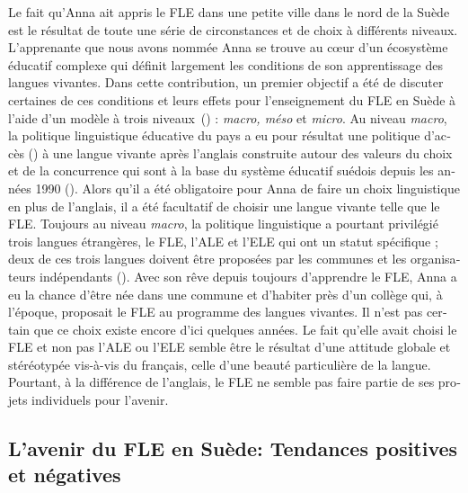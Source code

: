 \documentclass[french, output=paper]{langscibook}
\begin{document}
\begin{otherlanguage}{french}
Le fait qu’Anna ait appris le FLE dans une petite ville dans le nord de la Suède est le résultat de toute une série de circonstances et de choix à différents niveaux. L’apprenante que nous avons nommée Anna se trouve au cœur d’un écosystème éducatif complexe qui définit largement les conditions de son apprentissage des langues vivantes. Dans cette contribution, un premier objectif a été de discuter certaines de ces conditions et leurs effets pour l’enseignement du FLE en Suède à l’aide d’un modèle à trois niveaux~(\citealt{TheDouglasFirgroup2016}) : \textit{macro, méso} et \textit{micro}. Au niveau \textit{macro}, la politique linguistique éducative du pays a eu pour résultat une politique d’accès (\citealt{KaplanBaldauf2005}) à une langue vivante après l’anglais construite autour des valeurs du choix et de la concurrence qui sont à la base du système éducatif suédois depuis les années 1990 (\citealt{YangHansenGustafsson2016}). Alors qu’il a été obligatoire pour Anna de faire un choix linguistique en plus de l’anglais, il a été facultatif de choisir une langue vivante telle que le FLE. Toujours au niveau \textit{macro}, la politique linguistique a pourtant privilégié trois langues étrangères, le FLE, l’ALE et l’ELE qui ont un statut spécifique ; deux de ces trois langues doivent être proposées par les communes et les organisateurs indépendants (\citealt{Ministèredéducation2011}). Avec son rêve depuis toujours d’apprendre le FLE, Anna a eu la chance d’être née dans une commune et d’habiter près d’un collège qui, à l’époque, proposait le FLE au programme des langues vivantes. Il n’est pas certain que ce choix existe encore d’ici quelques années. Le fait qu’elle avait choisi le FLE et non pas l’ALE ou l’ELE semble être le résultat d’une attitude globale et stéréotypée vis-à-vis du français, celle d’une beauté particulière de la langue. Pourtant, à la différence de l’anglais, le FLE ne semble pas faire partie de ses projets individuels pour l’avenir.

\subsection{L’avenir du FLE en Suède: Tendances positives et négatives}\label{sec:granfeldt:6.2}\largerpage


\end{otherlanguage}
\end{document}
